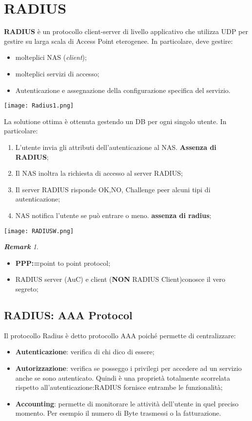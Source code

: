 \documentclass{article}
\theoremstyle{remark}
\newtheorem*{remark}{\textbf{Remark}}
\begin{document}
\section{RADIUS}
\textbf{RADIUS} è un protocollo client-server di livello applicativo che utilizza UDP per gestire su larga scala di Access Point eterogenee. In particolare, deve gestire:\begin{itemize}
	\item molteplici NAS (\emph{client});
	\item molteplici servizi di accesso;
	\item Autenticazione e assegnazione della configurazione specifica del servizio.
\end{itemize}
\begin{center}
	\texttt{[image: Radius1.png]}
\end{center}
La solutione ottima è ottenuta gestendo un DB per ogni singolo utente. In particolare:\begin{enumerate}
	\item L'utente invia gli attributi dell'autenticazione al NAS. \textbf{Assenza di RADIUS};
	\item Il NAS inoltra la richiesta di accesso al server RADIUS;
	\item Il server RADIUS risponde OK,NO, Challenge peer alcuni tipi di autenticazione;
	\item NAS notifica l'utente se può entrare o meno. \textbf{assenza di radius};
\end{enumerate}
\begin{center}
	\texttt{[image: RADIUSW.png]}
\end{center}
\begin{remark}
	\begin{itemize}
		\item \textbf{PPP:=}point to point protocol;
		\item RADIUS server (AuC) e client (\textbf{NON} RADIUS Client)conosce il vero segreto;
	\end{itemize}
\end{remark}
\subsection{RADIUS: AAA Protocol}
Il protocollo Radius è detto protocollo AAA poiché permette di centralizzare:\begin{itemize}
	\item \textbf{Autenticazione}: verifica di chi dico di essere;
	\item \textbf{Autorizzazione}: verifica se posseggo i privilegi per accedere ad un servizio anche se sono autenticato. Quindi è una proprietà totalmente scorrelata rispetto all'autenticazione:RADIUS fornisce entrambe le funzionalità;
	\item \textbf{Accounting}: permette di monitorare le attività dell'utente in quel preciso momento. Per esempio il numero di Byte trasmessi o la fatturazione.
\end{itemize}
\end{document}
